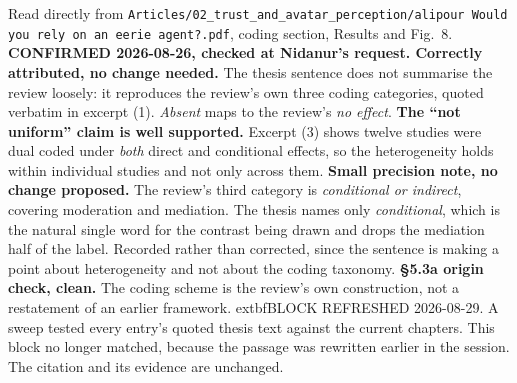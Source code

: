 \documentclass[11pt, a4paper]{article}
\begin{document}
\begin{Form}
  {Read directly from \texttt{\footnotesize Articles/02\_trust\_and\_avatar\_perception/alipour Would you rely on an eerie agent?.pdf}, coding section, Results and Fig.~8. \textbf{CONFIRMED 2026-08-26, checked at Nidanur's request. Correctly attributed, no change needed.} The thesis sentence does not summarise the review loosely: it reproduces the review's own three coding categories, quoted verbatim in excerpt (1). \emph{Absent} maps to the review's \emph{no effect}. \textbf{The ``not uniform'' claim is well supported.} Excerpt (3) shows twelve studies were dual coded under \emph{both} direct and conditional effects, so the heterogeneity holds within individual studies and not only across them. \textbf{Small precision note, no change proposed.} The review's third category is \emph{conditional or indirect}, covering moderation and mediation. The thesis names only \emph{conditional}, which is the natural single word for the contrast being drawn and drops the mediation half of the label. Recorded rather than corrected, since the sentence is making a point about heterogeneity and not about the coding taxonomy. \textbf{\S5.3a origin check, clean.} The coding scheme is the review's own construction, not a restatement of an earlier framework. 	extbf{BLOCK REFRESHED 2026-08-29.} A sweep tested every entry's quoted thesis text against the current chapters. This block no longer matched, because the passage was rewritten earlier in the session. The citation and its evidence are unchanged.}



\end{Form}
\end{document}
